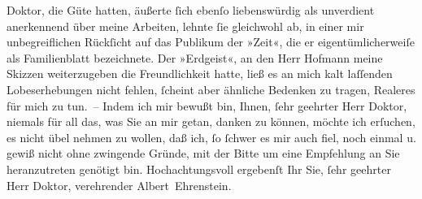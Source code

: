                Doktor, die Güte hatten, äußerte ſich ebenſo liebenswürdig als unverdient anerkennend
               über meine Arbeiten, lehnte ſie gleichwohl ab, in einer {\pb}mir unbegreiflichen Rückſicht auf das
               Publikum der »Zeit«, die er eigentümlicherweiſe
               als Familienblatt bezeichnete. Der »Erdgeist«, an
               den Herr Hofmann meine Skizzen weiterzugeben
               die Freundlichkeit hatte, ließ es an mich kalt laſſenden Lobeserhebungen nicht
               fehlen, ſcheint aber ähnliche Bedenken zu tragen, Realeres für mich zu tun. – Indem
               ich mir bewußt bin, Ihnen, ſehr geehrter Herr Doktor, niemals für all das, was Sie an
               mir getan, danken zu können, möchte ich erſuchen, es nicht übel nehmen zu wollen, daß
               ich, ſo ſchwer es mir auch fiel, noch einmal u. gewiß nicht ohne zwingende Gründe,
               mit der Bitte um eine Empfehlung an Sie heranzutreten genötigt bin. Hochachtungsvoll
               ergebenſt Ihr Sie, ſehr geehrter Herr Doktor, verehrender\pend
           \pstart \spacefill\mbox{Albert Ehrenstein.}\pend{}\endnumbering{}  
      